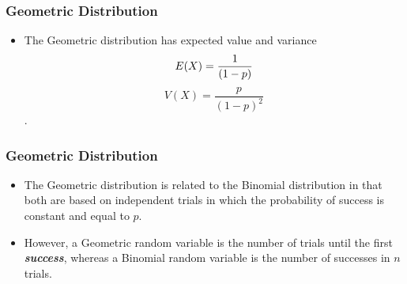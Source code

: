 \documentclass{beamer}
\begin{document}
\begin{frame}
\frametitle{Geometric Distribution}
\Large
\begin{itemize}
\item The Geometric distribution has expected value and variance  \[E(X)= {1\over(1-p)}\] \[V(X)=\frac{p}{{(1-p)^2}}\].

\end{itemize}

\end{frame}
\begin{frame}
\frametitle{Geometric Distribution}
\Large
\begin{itemize}
\item The Geometric distribution is related to the Binomial distribution in that both are based on independent trials in which the probability of success is constant and equal to $p$. 

\item However, a Geometric random variable is the number of trials until the first \textit{\textbf{success}}, whereas a Binomial random variable is the number of successes in $n$ trials.
\end{itemize}
\end{frame}
\end{document}
